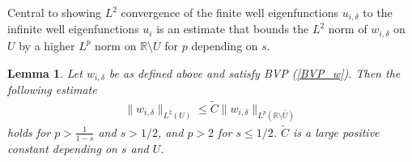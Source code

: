 \documentclass[preprint,12pt]{elsarticle}
\newcommand{\R}{\mathbb R}
\newtheorem{lemma}[theorem]{Lemma}
\begin{document}
Central to showing $L^2$ convergence of the finite well eigenfunctions $u_{i,\delta}$ to the infinite well eigenfunctions $u_i$ is an estimate that bounds the $L^2$ norm of $w_{i,\delta}$ on $U$ by a higher $L^p$ norm on $\R\setminus\overline{U}$ for $p$ depending on $s$.
\begin{lemma}\label{L2_estimate_w} Let $w_{i,\delta}$ be as defined above and satisfy BVP (\ref{BVP_w}). Then the following estimate 
\begin{align}\label{L2_bound_w}
\|w_{i,\delta}\|_{L^2(U)}\leq \tilde{C}\|w_{i,\delta}\|_{L^p(\R\setminus\overline{U})}
\end{align}
holds for $p> \frac{1}{1-s}$ and $s>1/2$, and $p>2$ for $s\leq 1/2$. $\tilde{C}$ is a large positive constant depending on $s$ and $U$.
\end{lemma}
\end{document}
